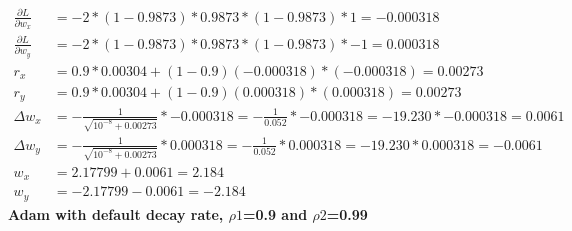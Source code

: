 \documentclass{article}
\begin{document}
\begin{align*}
    \frac{\partial L}{\partial w_x}
    &=-2*(1-0.9873)*0.9873*(1-0.9873)*1=-0.000318\\ 
    \frac{\partial L}{\partial w_y}
    &=-2*(1-0.9873)*0.9873*(1-0.9873)*-1=0.000318\\
    r_x
    &=0.9*0.00304+(1-0.9)(-0.000318)*(-0.000318)=0.00273\\
    r_y
    &=0.9*0.00304+(1-0.9)(0.000318)*(0.000318)=0.00273\\
    \Delta w_x
    &=-\frac{1}{\sqrt{10^{-8}+0.00273}}*-0.000318=-\frac{1}{0.052}*-0.000318=-19.230*-0.000318=0.0061 \\
    \Delta w_y
    &=-\frac{1}{\sqrt{10^{-8}+0.00273}}*0.000318=-\frac{1}{0.052}*0.000318=-19.230*0.000318=-0.0061\\
    w_x
    &=2.17799+0.0061=2.184\\
    w_y
    &=-2.17799-0.0061=-2.184 
\end{align*}
\textbf{Adam with default decay rate, $\rho1$=0.9 and $\rho2$=0.99}
\end{document}
